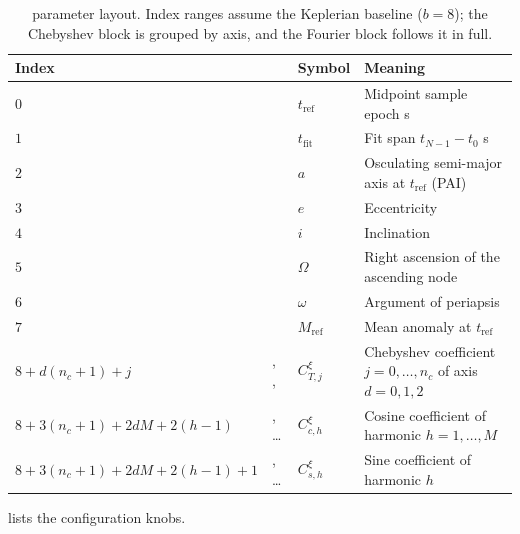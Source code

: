 \begin{table}[H]
  \centering
  \caption{ parameter layout. Index ranges assume the
    Keplerian baseline ($b = 8$); the Chebyshev block is grouped by axis, and
    the Fourier block follows it in full.}
  \label{tab:eph-params}
  \begin{tabularx}{\textwidth}{@{}l l l L@{}}
    \toprule
    Index &  & Symbol & Meaning \\
    \midrule
    $0$ &  & $t_\mathrm{ref}$ & Midpoint sample epoch \si{\second} \\
    $1$ &  & $t_\mathrm{fit}$ & Fit span $t_{N-1}-t_0$ \si{\second} \\
    $2$ &  & $a$ & Osculating semi-major axis at $t_\mathrm{ref}$ (PAI) \\
    $3$ &  & $e$ & Eccentricity \\
    $4$ &  & $i$ & Inclination \\
    $5$ &  & $\Omega$ & Right ascension of the ascending node \\
    $6$ &  & $\omega$ & Argument of periapsis \\
    $7$ &  & $M_\mathrm{ref}$ & Mean anomaly at $t_\mathrm{ref}$ \\
    \midrule
    $8+d(n_c{+}1)+j$ & , ,  & $C^{\xi}_{T,j}$ &
      Chebyshev coefficient $j = 0,\dots,n_c$ of axis $d = 0,1,2$ \\
    $8+3(n_c{+}1)+2dM+2(h{-}1)$ & , \dots & $C^{\xi}_{c,h}$ &
      Cosine coefficient of harmonic $h = 1,\dots,M$ \\
    $8+3(n_c{+}1)+2dM+2(h{-}1)+1$ & , \dots & $C^{\xi}_{s,h}$ &
      Sine coefficient of harmonic $h$ \\
    \bottomrule
  \end{tabularx}
\end{table}

 lists the configuration knobs.

